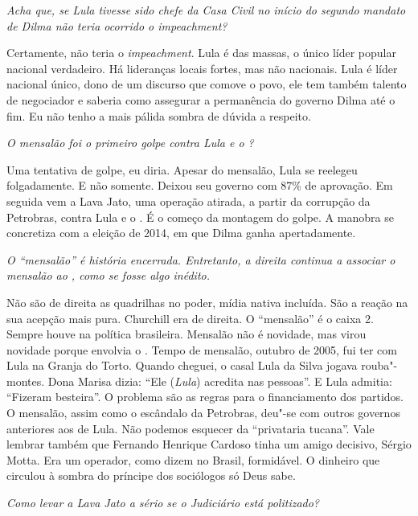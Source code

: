 \itshape
 Acha que, se Lula tivesse sido chefe da Casa Civil no
início do segundo mandato de Dilma não teria ocorrido o
\emph{impeachment}?

\normalfont
Certamente, não teria o \emph{impeachment}. Lula é das
massas, o único líder popular nacional verdadeiro. Há lideranças locais
fortes, mas não nacionais. Lula é líder nacional único, dono de um
discurso que comove o povo, ele tem também talento de negociador e
saberia como assegurar a permanência do governo Dilma até o fim. Eu não
tenho a mais pálida sombra de dúvida a respeito.

\itshape
 O mensalão foi o primeiro golpe contra Lula e o ?

\normalfont
Uma tentativa de golpe, eu diria. Apesar do mensalão,
Lula se reelegeu folgadamente. E não somente. Deixou seu governo com
87\% de aprovação. Em seguida vem a Lava Jato, uma operação atirada, a
partir da corrupção da Petrobras, contra Lula e o . É o começo da
montagem do golpe. A manobra se concretiza com a eleição de 2014, em que
Dilma ganha apertadamente.

\itshape
 O ``mensalão'' é história encerrada. Entretanto, a
direita continua a associar o mensalão ao , como se fosse algo
inédito.

\normalfont
Não são de direita as quadrilhas no poder, mídia nativa
incluída. São a reação na sua acepção mais pura. Churchill era de
direita. O ``mensalão'' é o caixa 2. Sempre houve na política
brasileira. Mensalão não é novidade, mas virou novidade porque envolvia
o . Tempo de mensalão, outubro de 2005, fui ter com Lula na Granja do
Torto. Quando cheguei, o casal Lula da Silva jogava rouba"-montes. Dona
Marisa dizia: ``Ele (\emph{Lula}) acredita nas pessoas''. E Lula
admitia: ``Fizeram besteira''. O problema são as regras para o
financiamento dos partidos. O mensalão, assim como o escândalo da
Petrobras, deu"-se com outros governos anteriores aos de Lula. Não
podemos esquecer da ``privataria tucana''. Vale lembrar também que
Fernando Henrique Cardoso tinha um amigo decisivo, Sérgio Motta. Era um
operador, como dizem no Brasil, formidável. O dinheiro que circulou à
sombra do príncipe dos sociólogos só Deus sabe.

\itshape
 Como levar a Lava Jato a sério se o Judiciário está
politizado?

